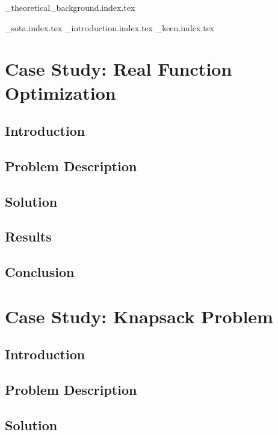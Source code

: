 \pagestyle{fancy}
{_theoretical_background.index.tex}

{_sota.index.tex}
{_introduction.index.tex}
{_keen.index.tex}

\chapter{Case Study: Real Function Optimization}
\label{chap:case_study_real_function_optimization}
  \section{Introduction}
  \label{sec:introduction}
    \Blindtext
  \section{Problem Description}
  \label{sec:problem_description}
    \Blindtext
  \section{Solution}
  \label{sec:solution}
    \Blindtext
  \section{Results}
  \label{sec:results}
    \Blindtext
  \section{Conclusion}
  \label{sec:conclusion}
    \Blindtext

\chapter{Case Study: Knapsack Problem}
\label{chap:case_study_knapsack}
  \section{Introduction}
  \label{sec:introduction}
    \Blindtext
  \section{Problem Description}
  \label{sec:problem_description}
    \Blindtext
  \section{Solution}
  \label{sec:solution}
    \Blindtext
